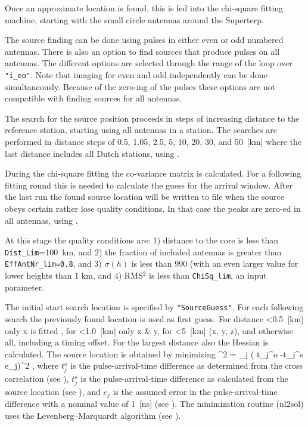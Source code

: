 Once an approximate location is found, this is fed into the chi-square fitting machine, starting with the small circle antennas around the Superterp.


The source finding can be done using pulses in either even or odd numbered antennas. There is also an option to find sources that produce pulses on all antennas. The different options are selected through the range of the loop over \verb!"i_eo"!. Note that imaging for even and odd independently can be done simultaneously. Because of the zero-ing of the pulses these options are not compatible with finding sources for all antennas.

The search for the source position proceeds in steps of increasing distance to the reference station, starting using all antennas in a station. The searches are performed in distance steps of 0.5, 1.05, 2.5, 5, 10, 20, 30, and 50~[km] where the last distance includes all Dutch stations, using .

During the chi-square fitting the co-variance matrix is calculated. For a following fitting round this is needed to calculate the guess for the arrival window. After the last run the found source location will be written to file when the source obeys certain rather lose quality conditions. In that case the peaks are zero-ed in all antennas, using .

At this stage the quality conditions are:
1) distance to the core is less than \verb!Dist_Lim!=100~km, and
2) the fraction of included antennas is greater than \verb!EffAntNr_lim=0.8!, and
3) $\sigma(h)$ is less than 990 (with an even larger value for lower heights than 1 km, and
4) RMS$^2$ is less than \verb!ChiSq_lim!, an input parameter.


The initial start search location is specified by \verb!"SourceGuess"!. For each following search the previously found location is used as first guess. For distance \textless 0.5~[km] only x is fitted , for \textless 1.0~[km] only x \& y, for \textless 5~[km] (x, y, z), and otherwise all, including a timing offset. For the largest distance also the Hessian is calculated.
The source location is obtained by minimizing
\beq
\chi^2 = \sum_{j} \left( {\delta t_j^o -\delta t_j^s \over e_j}\right)^2 \;,
\eeq
where $t_j^o$ is the pulse-arrival-time difference as determined from the cross correlation (see ), $t_j^s$ is the pulse-arrival-time difference as calculated from the source location (see ), and $e_j$ is the assumed error in the pulse-arrival-time difference with a nominal value of 1~[ns] (see ). The minimization routine (nl2sol) uses the Levenberg--Marquardt algorithm (see ).

